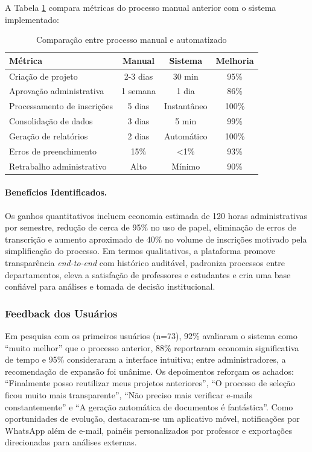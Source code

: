 \documentclass[portuguese]{sbc2025}%
\begin{document}
A Tabela \ref{tab:comparacao} compara métricas do processo manual anterior com o sistema implementado:

\begin{table}[t]
  \centering
  \caption{Comparação entre processo manual e automatizado}
  \label{tab:comparacao}
  \begin{adjustbox}{max width=\textwidth}
    \begin{tabular}{|l|c|c|c|}
      \hline
      \textbf{Métrica} & \textbf{Manual} & \textbf{Sistema} & \textbf{Melhoria} \\
      \hline
      Criação de projeto & 2-3 dias & 30 min & 95\% \\
      Aprovação administrativa & 1 semana & 1 dia & 86\% \\
      Processamento de inscrições & 5 dias & Instantâneo & 100\% \\
      Consolidação de dados & 3 dias & 5 min & 99\% \\
      Geração de relatórios & 2 dias & Automático & 100\% \\
      Erros de preenchimento & 15\% & <1\% & 93\% \\
      Retrabalho administrativo & Alto & Mínimo & 90\% \\
      \hline
    \end{tabular}
  \end{adjustbox}
\end{table}

\paragraph{Benefícios Identificados.}

Os ganhos quantitativos incluem economia estimada de 120 horas administrativas por semestre, redução de cerca de 95\% no uso de papel, eliminação de erros de transcrição e aumento aproximado de 40\% no volume de inscrições motivado pela simplificação do processo. Em termos qualitativos, a plataforma promove transparência \textit{end-to-end} com histórico auditável, padroniza processos entre departamentos, eleva a satisfação de professores e estudantes e cria uma base confiável para análises e tomada de decisão institucional.

\subsubsection{Feedback dos Usuários}

Em pesquisa com os primeiros usuários (n=73), 92\% avaliaram o sistema como “muito melhor” que o processo anterior, 88\% reportaram economia significativa de tempo e 95\% consideraram a interface intuitiva; entre administradores, a recomendação de expansão foi unânime. Os depoimentos reforçam os achados: “Finalmente posso reutilizar meus projetos anteriores”, “O processo de seleção ficou muito mais transparente”, “Não preciso mais verificar e-mails constantemente” e “A geração automática de documentos é fantástica”. Como oportunidades de evolução, destacaram-se um aplicativo móvel, notificações por WhatsApp além de e-mail, painéis personalizados por professor e exportações direcionadas para análises externas.
\end{document}
